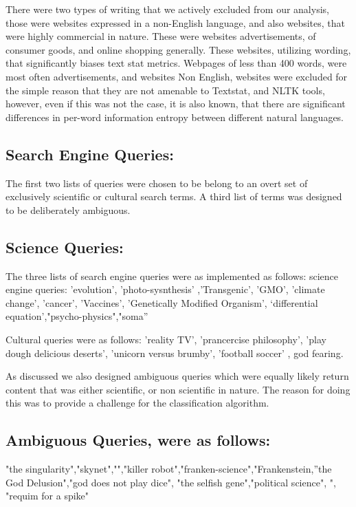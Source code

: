 \documentclass{clv3}
\begin{document}
There were two types of writing that we actively excluded from our analysis, those were websites expressed in a non-English language, and also websites, that were highly commercial in nature. These were websites advertisements, of consumer goods, and online shopping generally. These websites, utilizing wording, that significantly biases text stat metrics. Webpages of less than 400 words, were most often advertisements, and websites
Non English, websites were excluded for the simple reason that they are not amenable to Textstat, and NLTK tools, however, even if this was not the case, it is also known, that there are  significant differences in per-word information entropy between different natural languages.

\subsection{Search Engine Queries:}
The first two lists of queries were chosen to be belong to an overt set of exclusively scientific or cultural search terms. A third list of terms was designed to be deliberately ambiguous.

\subsection{Science Queries:}
The three lists of search engine queries were as implemented as follows: science engine queries: 'evolution', 'photo-sysnthesis' ,'Transgenic', 'GMO', 'climate change', 'cancer', 'Vaccines', 'Genetically Modified Organism', ‘differential equation’,"psycho-physics","soma”

Cultural queries were as follows: 'reality TV', 'prancercise philosophy', 'play dough delicious deserts', 'unicorn versus brumby', 'football soccer' , god fearing.

As discussed we also designed ambiguous queries which were equally likely return content that was either scientific, or non scientific in nature. The reason for doing this was to provide a challenge for the classification algorithm.

\subsection{Ambiguous Queries, were as follows:}

"the singularity","skynet","","killer robot","franken-science","Frankenstein,”the God Delusion","god does not play dice", "the selfish gene","political science", ", "requim for a spike"
\end{document}
